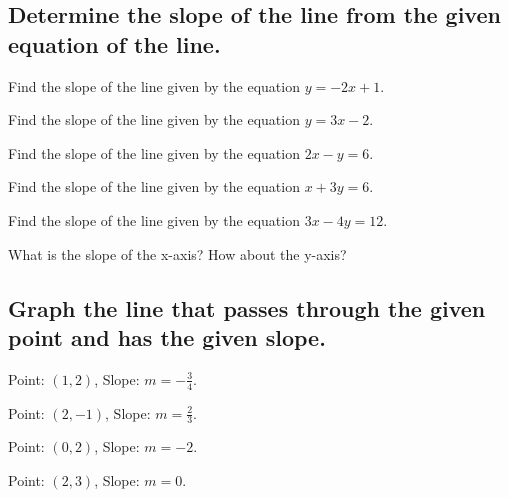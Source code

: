 \subsection*{Determine the slope of the line from the given equation of the line.}

\begin{puzzle}
    Find the slope of the line given by the equation $y = -2x + 1$.
\end{puzzle}

\begin{puzzle}
    Find the slope of the line given by the equation $y = 3x - 2$.
\end{puzzle}

\begin{puzzle}
    Find the slope of the line given by the equation $2x - y = 6$.
\end{puzzle}

\begin{puzzle}
    Find the slope of the line given by the equation $x + 3y = 6$.
\end{puzzle}

\begin{puzzle}
    Find the slope of the line given by the equation $3x - 4y = 12$.
\end{puzzle}

\begin{puzzle}
    What is the slope of the x-axis? How about the y-axis?
\end{puzzle}

\subsection*{Graph the line that passes through the given point and has the given slope.}

\begin{puzzle}
    Point: $(1, 2)$, Slope: $m = -\frac{3}{4}$.
\end{puzzle}

\begin{puzzle}
    Point: $(2, -1)$, Slope: $m = \frac{2}{3}$.
\end{puzzle}

\begin{puzzle}
    Point: $(0, 2)$, Slope: $m = -2$.
\end{puzzle}

\begin{puzzle}
    Point: $(2, 3)$, Slope: $m = 0$.
\end{puzzle}